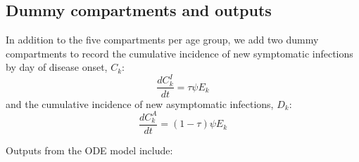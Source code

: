 \documentclass{article}
\begin{document}
	\subsection{Dummy compartments and outputs}
	
	In addition to the five compartments per age group, we add two dummy compartments to record the cumulative incidence of new symptomatic infections by day of disease onset, $C_k$:
	\begin{equation}
	\frac{dC^I_k}{dt} = \tau \psi E_k
	\end{equation}
	and the cumulative incidence of new asymptomatic infections, $D_k$:
	\begin{equation}
	\frac{dC^A_k}{dt} = (1-\tau) \psi E_k
	\end{equation}
	
	Outputs from the ODE model include:
	
	
\end{document}
